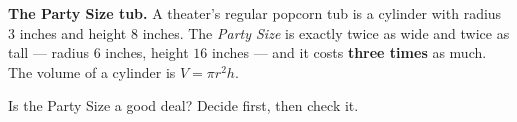 \documentclass[10pt]{article}
\begin{document}
\vspace{0.10in}

\boxguard[11]
\begin{hookbox}
\small
\textbf{The Party Size tub.} A theater's regular popcorn tub is a cylinder with radius $3$ inches
and height $8$ inches. The \emph{Party Size} is exactly twice as wide and twice as tall ---
radius $6$ inches, height $16$ inches --- and it costs \textbf{three times} as much. The volume
of a cylinder is $V=\pi r^2 h$.

Is the Party Size a good deal? Decide first, then check it.

\\
\\
\end{hookbox}

\vspace{0.10in}
\end{document}
